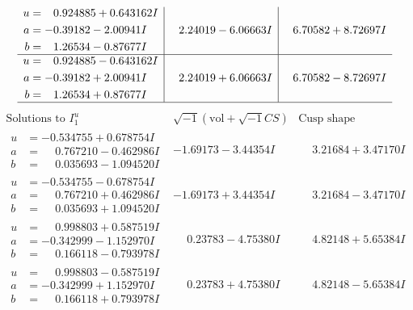 \documentclass[1p]{elsarticle_modified}
\theoremstyle{definition}
\newcommand{\I}{\sqrt{-1}}
\begin{document}
$$\begin{array}{c|c|c}
\begin{aligned}
u &= \phantom{-}0.924885 + 0.643162 I \\
a &= -0.39182 - 2.00941 I \\
b &= \phantom{-}1.26534 - 0.87677 I\end{aligned}
 & \phantom{-}2.24019 - 6.06663 I & \phantom{-}6.70582 + 8.72697 I \\ \hline\begin{aligned}
u &= \phantom{-}0.924885 - 0.643162 I \\
a &= -0.39182 + 2.00941 I \\
b &= \phantom{-}1.26534 + 0.87677 I\end{aligned}
 & \phantom{-}2.24019 + 6.06663 I & \phantom{-}6.70582 - 8.72697 I\\
 \hline 
 \end{array}$$\newpage$$\begin{array}{c|c|c}  
\text{Solutions to }I^u_{1}& \I (\text{vol} + \sqrt{-1}CS) & \text{Cusp shape}\\
 \hline 
\begin{aligned}
u &= -0.534755 + 0.678754 I \\
a &= \phantom{-}0.767210 - 0.462986 I \\
b &= \phantom{-}0.035693 - 1.094520 I\end{aligned}
 & -1.69173 - 3.44354 I & \phantom{-}3.21684 + 3.47170 I \\ \hline\begin{aligned}
u &= -0.534755 - 0.678754 I \\
a &= \phantom{-}0.767210 + 0.462986 I \\
b &= \phantom{-}0.035693 + 1.094520 I\end{aligned}
 & -1.69173 + 3.44354 I & \phantom{-}3.21684 - 3.47170 I \\ \hline\begin{aligned}
u &= \phantom{-}0.998803 + 0.587519 I \\
a &= -0.342999 - 1.152970 I \\
b &= \phantom{-}0.166118 - 0.793978 I\end{aligned}
 & \phantom{-}0.23783 - 4.75380 I & \phantom{-}4.82148 + 5.65384 I \\ \hline\begin{aligned}
u &= \phantom{-}0.998803 - 0.587519 I \\
a &= -0.342999 + 1.152970 I \\
b &= \phantom{-}0.166118 + 0.793978 I\end{aligned}
 & \phantom{-}0.23783 + 4.75380 I & \phantom{-}4.82148 - 5.65384 I \\ \hline\begin{aligned}

\end{aligned}
\end{array}$$
\end{document}
